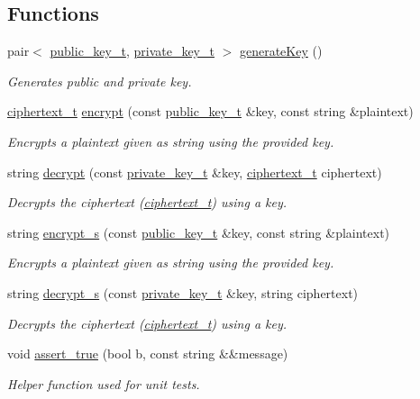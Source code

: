 \subsection*{Functions}
\begin{DoxyCompactItemize}
\item 
pair$<$ \mbox{\hyperlink{structelGamal_1_1public__key__t}{public\+\_\+key\+\_\+t}}, \mbox{\hyperlink{structelGamal_1_1private__key__t}{private\+\_\+key\+\_\+t}} $>$ \mbox{\hyperlink{namespaceelGamal_a146d7e0430b165ea18111d6342b7888b}{generate\+Key}} ()
\begin{DoxyCompactList}\small\item\em Generates public and private key. \end{DoxyCompactList}\item 
\mbox{\hyperlink{structelGamal_1_1ciphertext__t}{ciphertext\+\_\+t}} \mbox{\hyperlink{namespaceelGamal_aea2534e80b8368b1dd998cff835ef643}{encrypt}} (const \mbox{\hyperlink{structelGamal_1_1public__key__t}{public\+\_\+key\+\_\+t}} \&key, const string \&plaintext)
\begin{DoxyCompactList}\small\item\em Encrypts a plaintext given as string using the provided key. \end{DoxyCompactList}\item 
string \mbox{\hyperlink{namespaceelGamal_a7d43bd19f4fbfe6cca1232a7b2f23af6}{decrypt}} (const \mbox{\hyperlink{structelGamal_1_1private__key__t}{private\+\_\+key\+\_\+t}} \&key, \mbox{\hyperlink{structelGamal_1_1ciphertext__t}{ciphertext\+\_\+t}} ciphertext)
\begin{DoxyCompactList}\small\item\em Decrypts the ciphertext (\mbox{\hyperlink{structelGamal_1_1ciphertext__t}{ciphertext\+\_\+t}}) using a key. \end{DoxyCompactList}\item 
string \mbox{\hyperlink{namespaceelGamal_af1b50ebf015473027eadf9ba9f12ba95}{encrypt\+\_\+s}} (const \mbox{\hyperlink{structelGamal_1_1public__key__t}{public\+\_\+key\+\_\+t}} \&key, const string \&plaintext)
\begin{DoxyCompactList}\small\item\em Encrypts a plaintext given as string using the provided key. \end{DoxyCompactList}\item 
string \mbox{\hyperlink{namespaceelGamal_a91138d747c43e157f27fe43d0f338808}{decrypt\+\_\+s}} (const \mbox{\hyperlink{structelGamal_1_1private__key__t}{private\+\_\+key\+\_\+t}} \&key, string ciphertext)
\begin{DoxyCompactList}\small\item\em Decrypts the ciphertext (\mbox{\hyperlink{structelGamal_1_1ciphertext__t}{ciphertext\+\_\+t}}) using a key. \end{DoxyCompactList}\item 
void \mbox{\hyperlink{namespaceelGamal_a1be22a37709d73fbc4580b00a396c0b9}{assert\+\_\+true}} (bool b, const string \&\&message)
\begin{DoxyCompactList}\small\item\em Helper function used for unit tests. \end{DoxyCompactList}\end{DoxyCompactItemize}
